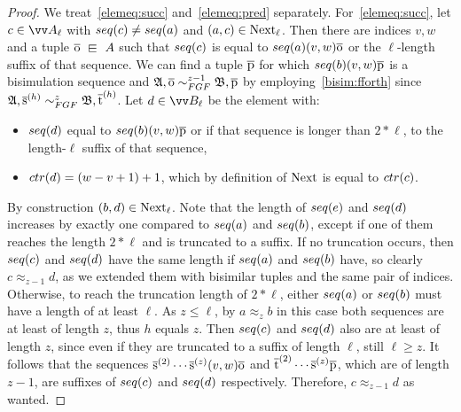 \begin{proof}
  We treat~\ref{elemeq:succ} and~\ref{elemeq:pred} separately.
  For~\ref{elemeq:succ}, let $c \in \unraveldom{A}_{\ell}$ with $\seq{c} \neq \seq{a}$ and $(a,c) \in \mathrm{Next}_{\ell}$.
  Then there are indices $v,w$ and a tuple $\elemtupleo \sqin A$ such that $\seq{c}$ is equal to $\seq{a} (v,w) \elemtupleo$ or the $\ell$-length suffix of that sequence.
  We can find a tuple $\overline{\mathrm{p}}$ for which $\seq{b}(v,w)\elemtuplep$ is a bisimulation sequence and $\str{A}, \elemtupleo \bisimto_{\FGF}^{z-1} \str{B}, \elemtuplep$ by employing~\ref{bisim:fforth} since $\str{A}, \elemtuples^{(h)} \bisimto_{\FGF}^{z} \str{B}, \elemtuplet^{(h)}$.
  Let $d \in \unraveldom{B}_{\ell}$ be the element with:
  \begin{itemize}
    \item $\seq{d}$ equal to $\seq{b} (v,w) \elemtuplep$ or if that sequence is longer than $2 * \ell$, to the length-$\ell$ suffix of that sequence,
    \item $\ctr{d} = (w-v+1) + 1$, which by definition of $\mathrm{Next}$ is equal to $\ctr{c}$.
  \end{itemize}
  By construction $(b, d) \in \mathrm{Next}_{\ell}$.
  Note that the length of $\seq{e}$ and $\seq{d}$ increases by exactly one compared to $\seq{a}$ and $\seq{b}$, except if one of them reaches the length $2 * \ell$ and is truncated to a suffix.
  If no truncation occurs, then $\seq{c}$ and $\seq{d}$ have the same length if $\seq{a}$ and $\seq{b}$ have, so clearly $c \approx_{z-1} d$, as we extended them with bisimilar tuples and the same pair of indices.
  Otherwise, to reach the truncation length of $2 * \ell$, either $\seq{a}$ or $\seq{b}$ must have a length of at least $\ell$.
  As $z \le \ell$, by $a \approx_{z} b$ in this case both sequences are at least of length $z$, thus $h$ equals $z$.
  Then $\seq{c}$ and $\seq{d}$ also are at least of length $z$, since even if they are truncated to a suffix of length $\ell$, still $\ell \ge z$.
  It follows that the sequences $\overline{\mathrm{s}}^{(2)}\cdots\overline{\mathrm{s}}^{(z)}(v,w)\overline{\mathrm{o}}$ and $\overline{\mathrm{t}}^{(2)}\cdots\overline{\mathrm{s}}^{(z)}\overline{\mathrm{p}}$, which are of length $z-1$, are suffixes of $\seq{c}$ and $\seq{d}$ respectively.
  Therefore, $c \approx_{z-1} d$ as wanted.


\end{proof}
